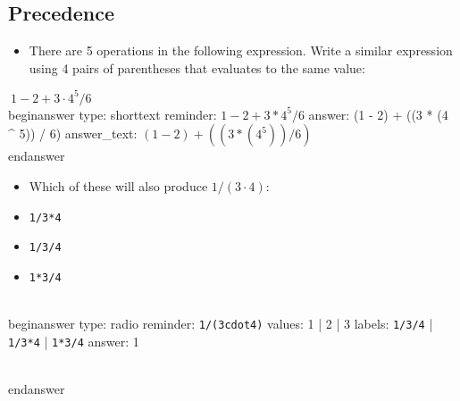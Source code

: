 \documentclass[12pt]{article}
\begin{document}
\subsection{Precedence}\begin{itemize}\item There are 5 operations in the following expression. Write a similar   expression using 4 pairs of parentheses that evaluates to the same   value:\end{itemize}$~
1 - 2 + 3 \cdot 4 ^ 5 / 6
~$
\\begin{answer}
type: shorttext
reminder: \( 1 - 2 + 3 * 4 ^ 5 / 6 \)
answer: (1 - 2) + ((3 * (4 ^ 5)) / 6)
answer_text: \( (1 - 2) + ((3 * (4 ^ 5)) / 6) \) 
\\end{answer}
\begin{itemize}\item Which of these will also produce $1/(3\cdot4)$:\end{itemize}\begin{itemize}\item \texttt{1/3*4}\end{itemize}\begin{itemize}\item \texttt{1/3/4}\end{itemize}\begin{itemize}\item \texttt{1*3/4}\end{itemize}
\\begin{answer}
type: radio
reminder: \verb+1/(3cdot4)+
values: 1 | 2 | 3
labels: \verb+1/3/4+ | \verb+1/3*4+ | \verb+1*3/4+
answer: 1

\\end{answer}
\end{document}
